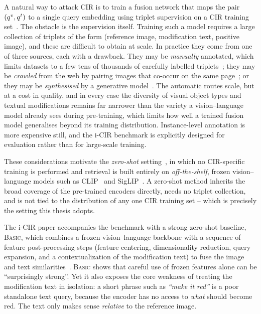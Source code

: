 A natural way to attack CIR is to train a fusion network that maps the pair
$(q^{v}, q^{t})$ to a single query embedding using triplet supervision on a CIR
training set~\cite{vo2019tirg}. The obstacle is the supervision itself. Training
such a model requires a large collection of triplets of the form (reference
image, modification text, positive image), and these are difficult to obtain at
scale. In practice they come from one of three sources, each with a drawback.
They may be \emph{manually} annotated, which limits datasets to a few tens of
thousands of carefully labelled triplets~\cite{vo2019tirg,wu2021fashioniq,liu2021cirr,baldrati2023circo};
they may be \emph{crawled} from the web by pairing images that co-occur on the
same page~\cite{zhang2024magiclens,ventura2024covr}; or they may be
\emph{synthesised} by a generative model~\cite{gu2024compodiff}. The automatic
routes scale, but at a cost in quality, and in every case the diversity of visual
object types and textual modifications remains far narrower than the variety a
vision--language model already sees during pre-training, which limits how well a
trained fusion model generalises beyond its training distribution. Instance-level
annotation is more expensive still, and the i-CIR benchmark is explicitly
designed for evaluation rather than for large-scale training.

These considerations motivate the \emph{zero-shot} setting~\cite{saito2023pic2word,baldrati2023circo},
in which no CIR-specific training is performed and retrieval is built entirely on
\emph{off-the-shelf}, frozen vision--language models such as
CLIP~\cite{radford2021clip} and SigLIP~\cite{zhai2023siglip,tschannen2025siglip2}.
A zero-shot method inherits the broad coverage of the pre-trained encoders
directly, needs no triplet collection, and is not tied to the distribution of any
one CIR training set -- which is precisely the setting this thesis adopts.

The i-CIR paper accompanies the benchmark with a strong zero-shot baseline,
\textsc{Basic}, which combines a frozen vision--language backbone with a
sequence of feature post-processing steps (feature centering, dimensionality
reduction, query expansion, and a contextualization of the modification text)
to fuse the image and text similarities~\cite{psomas2025icir}. \textsc{Basic}
shows that careful use of frozen features alone can be ``surprisingly strong''.
Yet it also exposes the core weakness of treating the modification text in
isolation: a short phrase such as \emph{``make it red''} is a poor standalone
text query, because the encoder has no access to \emph{what} should become red.
The text only makes sense \emph{relative} to the reference image.

